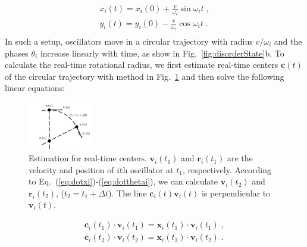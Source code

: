 \documentclass[%
 aip,
 amsmath,amssymb,
 reprint,%
]{revtex4-1}
\begin{document}
\begin{equation}
    \begin{array}{c}
        x_i\left( t \right) =x_i\left( 0 \right) +\frac{v}{\omega _i}\sin \omega _it\;,\\
        y_i\left( t \right) =y_i\left( 0 \right) -\frac{v}{\omega _i}\cos \omega _it\;.\\
    \end{array}
\end{equation}
In such a setup, oscillators move in a circular trajectory with radius $v/\omega _i$ and the phases $\theta_i$ increase linearly with time, as show in Fig.~\ref{fig:disorderState}b. To calculate the real-time rotational radius, we first estimate real-time centers $\mathbf{c}(t)$ of the circular trajectory with method in Fig.~\ref{fig:CenterEps} and then solve the following linear equations:

\begin{figure}[b]
    \includegraphics[width=0.25\textwidth]{./figs/CenterEps.pdf}
    \caption{\label{fig:CenterEps} Estimation for real-time centers. $\mathbf{v}_i(t_1)$ and $\mathbf{r}_i(t_1)$ are the velocity and position of $i$th oscillator at $t_1$, respectively. According to Eq.~(\ref{eq:dotxi})-(\ref{eq:dotthetai}), we can calculate $\mathbf{v}_i(t_2)$ and $\mathbf{r}_i(t_2)$, ($t_2=t_1+\Delta t$). 
    The line $\mathbf{c}_i(t)\mathbf{v}_i(t)$ is perpendicular to $\mathbf{v}_i(t)$.}
\end{figure}

\begin{equation}\label{eq:linearEquations}
    \begin{array}{c}
        \mathbf{c}_i\left( t_1 \right) \cdot \mathbf{v}_i\left( t_1 \right) =\mathbf{x}_i\left( t_1 \right) \cdot \mathbf{v}_i\left( t_1 \right)\;,\\
        \mathbf{c}_i\left( t_2 \right) \cdot \mathbf{v}_i\left( t_2 \right) =\mathbf{x}_i\left( t_2 \right) \cdot \mathbf{v}_i\left( t_2 \right)\;.\\
    \end{array}
\end{equation}
 
\end{document}
